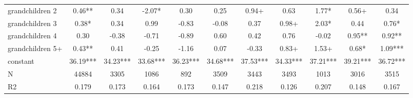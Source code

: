 {\begin{tabular}{l*{10}{c}}
grandchildren 2&        0.46** &        0.34   &       -2.07*  &        0.30   &        0.25   &        0.94+  &        0.63   &        1.77*  &        0.56+  &        0.34   \\
grandchildren 3&        0.38*  &        0.34   &        0.99   &       -0.83   &       -0.08   &        0.37   &        0.98+  &        2.03*  &        0.44   &        0.76*  \\
grandchildren 4&        0.30   &       -0.38   &       -0.71   &       -0.89   &        0.60   &        0.42   &        0.76   &       -0.02   &        0.95** &        0.92** \\
grandchildren 5+&        0.43** &        0.41   &       -0.25   &       -1.16   &        0.07   &       -0.33   &        0.83+  &        1.53+  &        0.68*  &        1.09***\\
constant    &       36.19***&       34.23***&       33.68***&       36.23***&       34.68***&       37.53***&       34.33***&       37.21***&       39.21***&       36.72***\\
\hline
N           &       44884   &        3305   &        1086   &         892   &        3509   &        3443   &        3493   &        1013   &        3016   &        3515   \\
R2          &       0.179   &       0.173   &       0.164   &       0.173   &       0.147   &       0.218   &       0.126   &       0.207   &       0.148   &       0.167   \\
\hline\hline
\end{tabular}
}

